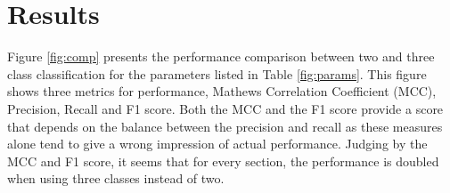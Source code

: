 \section{Results}

Figure \ref{fig:comp} presents the performance comparison between two and three class classification for the parameters listed in Table \ref{fig:params}. This figure shows three metrics for performance, Mathews Correlation Coefficient (MCC), Precision, Recall and F1 score. Both the MCC and the F1 score provide a score that depends on the balance between the precision and recall as these measures alone tend to give a wrong impression of actual performance. Judging by the MCC and F1 score, it seems that for every section, the performance is doubled when using three classes instead of two.


\datazero
{}\dataone
{}\datatwo
{}\datafone


